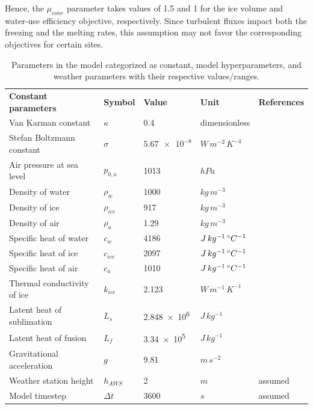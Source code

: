 \documentclass[tc, manuscript]{copernicus}
\begin{document}
Hence, the $\mu_{cone}$ parameter takes values of 1.5 and 1 for the ice volume and water-use efficiency
objective, respectively.  Since turbulent fluxes impact both the freezing and the melting rates, this assumption
may not favor the corresponding objectives for certain sites.

\appendixtables   

\begin{table}
  \caption{Parameters in the model categorized as constant, model hyperparameters, and weather 
  parameters with their respective values/ranges.}

	\label{tab:parameters}
	\begin{tabular}{lllll}
		\toprule

		\textbf{Constant parameters}                       & \textbf{Symbol} & \textbf{Value} &
    \textbf{Unit} & \textbf{References} \\
    Van Karman constant & $\kappa$      & 0.4        &dimensionless & \citet{cuffeyPhysicsGlaciers2010}              \\
    Stefan Boltzmann constant & $\sigma$ & $\num{5.67 e-8} $& $W\, m^{-2}\, K^{-4}$ & \citet{cuffeyPhysicsGlaciers2010}\\
    Air pressure at sea level & $p_{0,a}$ & 1013 & $hPa$  & \citet{molgAblationAssociatedEnergy2004}\\
    Density of water & $\rho_{w}$ & 1000 & $kg\, m^{-3}$    & \citet{cuffeyPhysicsGlaciers2010}\\
    Density of ice & $\rho_{ice}$ & 917 & $kg\, m^{-3}$ & \citet{cuffeyPhysicsGlaciers2010}\\
    Density of air & $\rho_{a}$ &  1.29 & $kg\, m^{-3}$   & \citet{molgAblationAssociatedEnergy2004}\\
    Specific heat of water & $c_{w}$ & 4186 & $J\, kg^{-1}\,^{\circ} C^{-1}$  & \citet{cuffeyPhysicsGlaciers2010}\\
    Specific heat of ice & $c_{ice}$ & 2097 & $J\, kg^{-1}\,^{\circ} C^{-1}$ & \citet{cuffeyPhysicsGlaciers2010}\\
    Specific heat of air & $c_{a}$ & 1010 & $J\, kg^{-1}\,^{\circ} C^{-1}$ & \citet{molgAblationAssociatedEnergy2004}\\
    Thermal conductivity of ice & $k_{ice}$ & 2.123  & $W\, m^{-1}\, K^{-1}$ & \citet{bonalesThermalConductivityIce2017} \\
    Latent heat of sublimation & $L_{s}$ & \num{2.848e6}  & $J\, kg^{-1}$ &   \citet{cuffeyPhysicsGlaciers2010}\\
    Latent heat of fusion & $L_{f}$ & \num{3.34e5} & $J\, kg^{-1}$ & \citet{cuffeyPhysicsGlaciers2010}\\
    Gravitational acceleration & $g$ & 9.81 & $m\, s^{-2}$ &\citet{cuffeyPhysicsGlaciers2010}\\
    Weather station height & $h_{AWS}$ & 2 & $m$ & assumed \\
    Model timestep                            & $\Delta t$            & $3600$           & $s$ & assumed \\\midrule


\end{tabular}
\end{table}
\end{document}
